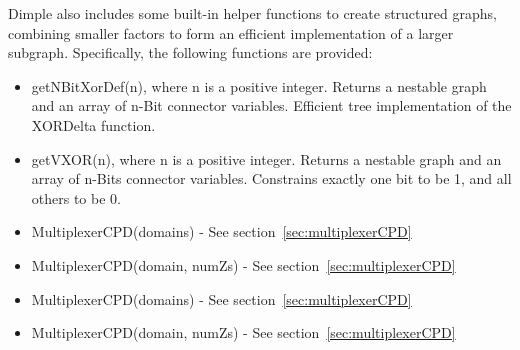 Dimple also includes some built-in helper functions to create structured graphs, combining smaller factors to form an efficient implementation of a larger subgraph.  Specifically, the following functions are provided:

\ifmatlab
\begin{itemize}
\item getNBitXorDef(n), where n is a positive integer. Returns a nestable graph and an array of n-Bit connector variables. Efficient tree implementation of the XORDelta function.
\item getVXOR(n), where n is a positive integer. Returns a nestable graph and an array of n-Bits connector variables. Constrains exactly one bit to be 1, and all others to be 0.
\item MultiplexerCPD(domains) - See section~\ref{sec:multiplexerCPD}
\item MultiplexerCPD(domain, numZs) - See section~\ref{sec:multiplexerCPD}
\end{itemize}
\fi

\ifjava
\begin{itemize}
\item MultiplexerCPD(domains) - See section~\ref{sec:multiplexerCPD}
\item MultiplexerCPD(domain, numZs) - See section~\ref{sec:multiplexerCPD}
\end{itemize}
\fi

